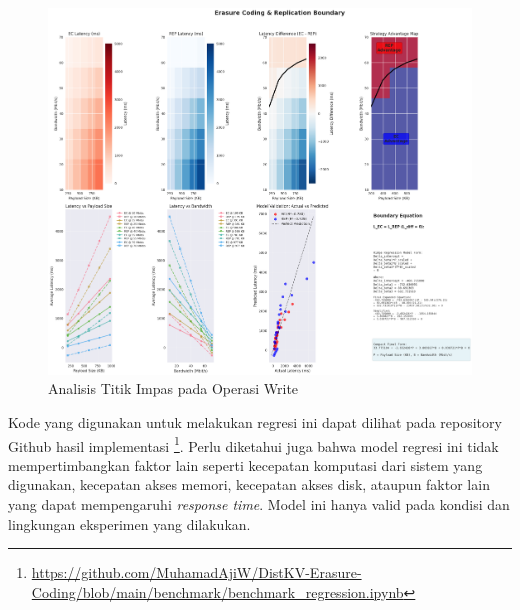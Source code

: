 \begin{enumerate}
  \begin{figure}[ht]
    \centering
    \includegraphics[width=\textwidth]{resources/chapter-4/write_bigload_avgnet_boundary.png}

    \caption{Analisis Titik Impas pada Operasi Write}
    \label{fig:write-bigload-avgnet-boundary}
  \end{figure}

  Kode yang digunakan untuk melakukan regresi ini dapat dilihat pada repository Github hasil implementasi \footnote{\url{https://github.com/MuhamadAjiW/DistKV-Erasure-Coding/blob/main/benchmark/benchmark_regression.ipynb}}. Perlu diketahui juga bahwa model regresi ini tidak mempertimbangkan faktor lain seperti kecepatan komputasi dari sistem yang digunakan, kecepatan akses memori, kecepatan akses disk, ataupun faktor lain yang dapat mempengaruhi \textit{response time}. Model ini hanya valid pada kondisi dan lingkungan eksperimen yang dilakukan.

\end{enumerate}